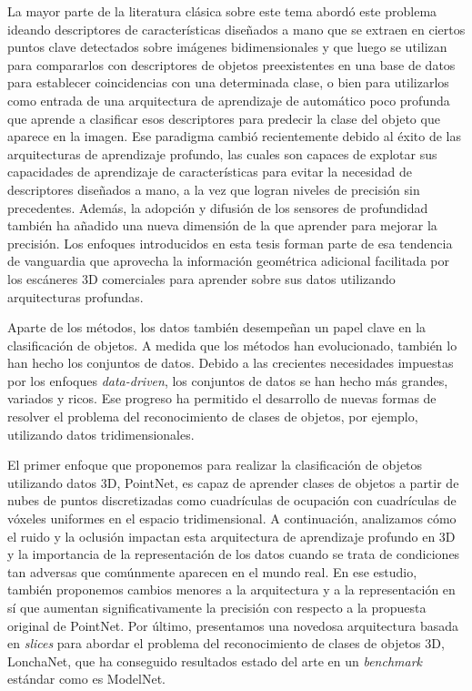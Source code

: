 La mayor parte de la literatura clásica sobre este tema abordó este problema ideando descriptores de características diseñados a mano que se extraen en ciertos puntos clave detectados sobre imágenes bidimensionales y que luego se utilizan para compararlos con descriptores de objetos preexistentes en una base de datos para establecer coincidencias con una determinada clase, o bien para utilizarlos como entrada de una arquitectura de aprendizaje de automático poco profunda que aprende a clasificar esos descriptores para predecir la clase del objeto que aparece en la imagen. Ese paradigma cambió recientemente debido al éxito de las arquitecturas de aprendizaje profundo, las cuales son capaces de explotar sus capacidades de aprendizaje de características para evitar la necesidad de descriptores diseñados a mano, a la vez que logran niveles de precisión sin precedentes. Además, la adopción y difusión de los sensores de profundidad también ha añadido una nueva dimensión de la que aprender para mejorar la precisión. Los enfoques introducidos en esta tesis forman parte de esa tendencia de vanguardia que aprovecha la información geométrica adicional facilitada por los escáneres 3D comerciales para aprender sobre sus datos utilizando arquitecturas profundas.

Aparte de los métodos, los datos también desempeñan un papel clave en la clasificación de objetos. A medida que los métodos han evolucionado, también lo han hecho los conjuntos de datos. Debido a las crecientes necesidades impuestas por los enfoques \emph{data-driven}, los conjuntos de datos se han hecho más grandes, variados y ricos. Ese progreso ha permitido el desarrollo de nuevas formas de resolver el problema del reconocimiento de clases de objetos, por ejemplo, utilizando datos tridimensionales.

El primer enfoque que proponemos para realizar la clasificación de objetos utilizando datos 3D, PointNet, es capaz de aprender clases de objetos a partir de nubes de puntos discretizadas como cuadrículas de ocupación con cuadrículas de vóxeles uniformes en el espacio tridimensional. A continuación, analizamos cómo el ruido y la oclusión impactan esta arquitectura de aprendizaje profundo en 3D y la importancia de la representación de los datos cuando se trata de condiciones tan adversas que comúnmente aparecen en el mundo real. En ese estudio, también proponemos cambios menores a la arquitectura y a la representación en sí que aumentan significativamente la precisión con respecto a la propuesta original de PointNet. Por último, presentamos una novedosa arquitectura basada en \emph{slices} para abordar el problema del reconocimiento de clases de objetos 3D, LonchaNet, que ha conseguido resultados estado del arte en un \emph{benchmark} estándar como es ModelNet.
